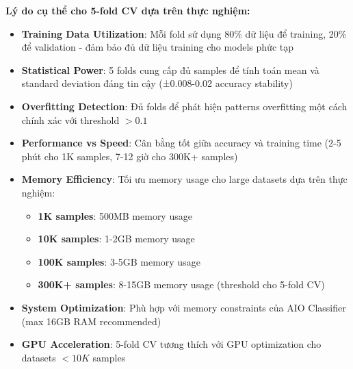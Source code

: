 \textbf{Lý do cụ thể cho 5-fold CV dựa trên thực nghiệm:}

\begin{itemize}
    \item \textbf{Training Data Utilization}: Mỗi fold sử dụng 80\% dữ liệu để training, 20\% để validation - đảm bảo đủ dữ liệu training cho models phức tạp
    \item \textbf{Statistical Power}: 5 folds cung cấp đủ samples để tính toán mean và standard deviation đáng tin cậy (±0.008-0.02 accuracy stability)
    \item \textbf{Overfitting Detection}: Đủ folds để phát hiện patterns overfitting một cách chính xác với threshold $>0.1$
    \item \textbf{Performance vs Speed}: Cân bằng tốt giữa accuracy và training time (2-5 phút cho 1K samples, 7-12 giờ cho 300K+ samples)
    \item \textbf{Memory Efficiency}: Tối ưu memory usage cho large datasets dựa trên thực nghiệm:
        \begin{itemize}
            \item \textbf{1K samples}: 500MB memory usage
            \item \textbf{10K samples}: 1-2GB memory usage  
            \item \textbf{100K samples}: 3-5GB memory usage
            \item \textbf{300K+ samples}: 8-15GB memory usage (threshold cho 5-fold CV)
        \end{itemize}
    \item \textbf{System Optimization}: Phù hợp với memory constraints của AIO Classifier (max 16GB RAM recommended)
    \item \textbf{GPU Acceleration}: 5-fold CV tương thích với GPU optimization cho datasets $<10K$ samples
\end{itemize}


